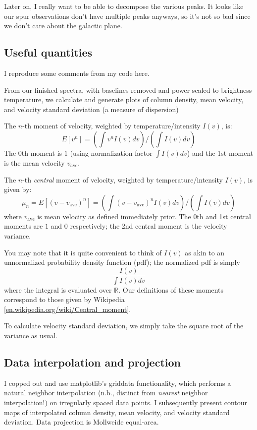\documentclass[10pt]{article}
\newcommand {\mt}{\mathrm}
\begin{document}
Later on, I really want to be able to decompose the various peaks.  It
looks like our spur observations don't have multiple peaks anyways, so it's not
so bad since we don't care about the galactic plane.

\subsection{Useful quantities}

I reproduce some comments from my code here.

From our finished spectra, with baselines removed and power scaled to brightness temperature, we calculate and generate plots of column density, mean velocity, and velocity standard deviation (a measure of dispersion)

The $n$-th moment of velocity, weighted by temperature/intensity $I(v)$, is:
\[
    E[v^n] = \left( \int v^n I(v) dv \right) / \left( \int I(v) dv \right)
\]
The $0$th moment is $1$ (using normalization factor $\int I(v) dv$) and the 1st moment is the mean velocity $v_{\mt{ave}}$.

The $n$-th \emph{central} moment of velocity, weighted by temperature/intensity $I(v)$, is given by:
\[
    \mu_n = E\left[ \left(v - v_{\mt{ave}} \right)^n \right]
          = \left( \int \left(v - v_{\mt{ave}} \right)^n I(v) dv \right) / \left( \int I(v) dv \right)
\]
where $v_{\mt{ave}}$ is mean velocity as defined immediately prior.  The 0th and 1st central moments are $1$ and $0$ respectively; the 2nd central moment is the velocity variance.

You may note that it is quite convenient to think of $I(v)$ as akin to an unnormalized probability density function (pdf); the normalized pdf is simply
\[
    \frac{I(v)}{\int I(v) dv}
\]
where the integral is evaluated over $\mathbb{R}$.  Our definitions of these moments correspond to those given by Wikipedia [\href{https://en.wikipedia.org/wiki/Central_moment#Univariate_moments}{en.wikipedia.org/wiki/Central\_moment}].

To calculate velocity standard deviation, we simply take the square root of the variance as usual.

\subsection{Data interpolation and projection}

I copped out and use matplotlib's griddata functionality, which performs a natural neighbor interpolation (n.b., distinct from \emph{nearest} neighbor interpolation!) on irregularly spaced data points.  I subsequently present contour maps of interpolated column density, mean velocity, and velocity standard deviation.  Data projection is Mollweide equal-area.
\end{document}
